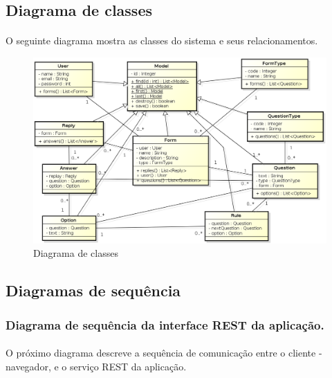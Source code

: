 \documentclass[11pt]{article}
\begin{document}
    \subsection{Diagrama de classes}
    
      \paragraph{}
      O seguinte diagrama mostra as classes do sistema e seus relacionamentos.
    
      \begin{figure}[h!]
        \centering
        \includegraphics[width=1.0\textwidth]{class_diagram.png}
        \caption{Diagrama de classes}
      \end{figure}
        
  \clearpage
  
    \subsection{Diagramas de sequência}
    
      \subsubsection{Diagrama de sequência da interface REST da aplicação.}
    
      \paragraph{}
      O próximo diagrama descreve a sequência de comunicação entre o cliente - navegador, e o 
      serviço REST da aplicação.
\end{document}
